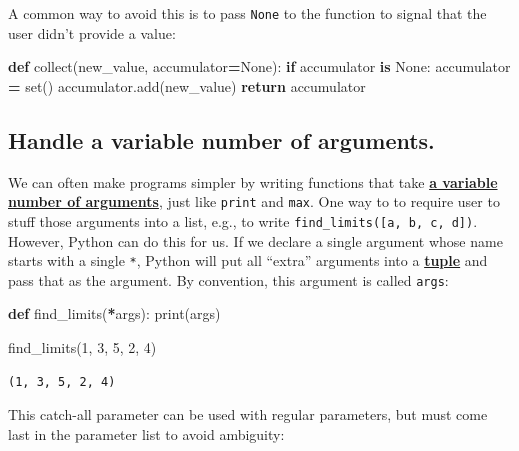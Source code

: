 \documentclass[
]{krantz}
\makeatletter
\newenvironment{Shaded}{\begin{snugshade}}{\end{snugshade}}
\newcommand{\BuiltInTok}[1]{#1}
\newcommand{\ControlFlowTok}[1]{\textcolor[rgb]{0.13,0.29,0.53}{\textbf{#1}}}
\newcommand{\DecValTok}[1]{\textcolor[rgb]{0.00,0.00,0.81}{#1}}
\newcommand{\KeywordTok}[1]{\textcolor[rgb]{0.13,0.29,0.53}{\textbf{#1}}}
\newcommand{\NormalTok}[1]{#1}
\newcommand{\OperatorTok}[1]{\textcolor[rgb]{0.81,0.36,0.00}{\textbf{#1}}}
\newcommand{\VariableTok}[1]{\textcolor[rgb]{0.00,0.00,0.00}{#1}}
\newenvironment{kframe}{%
\medskip{}
\setlength{\fboxsep}{.8em}
 \def\at@end@of@kframe{}%
 \ifinner\ifhmode%
  \def\at@end@of@kframe{\end{minipage}}%
  \begin{minipage}{\columnwidth}%
 \fi\fi%
 \def\FrameCommand##1{\hskip\@totalleftmargin \hskip-\fboxsep
 \colorbox{shadecolor}{##1}\hskip-\fboxsep
     \hskip-\linewidth \hskip-\@totalleftmargin \hskip\columnwidth}%
 \MakeFramed {\advance\hsize-\width
   \@totalleftmargin\z@ \linewidth\hsize
   \@setminipage}}%
 {\par\unskip\endMakeFramed%
 \at@end@of@kframe}
\renewenvironment{Shaded}{\begin{kframe}}{\end{kframe}}
\newcommand{\gref}[2]{\hyperlink{#2}{\textbf{#1}}}
\makeatother
\begin{document}
A common way to avoid this is to pass \texttt{None} to the function
to signal that the user didn't provide a value:

\begin{Shaded}
\begin{Highlighting}[]
\KeywordTok{def}\NormalTok{ collect(new\_value, accumulator}\OperatorTok{=}\VariableTok{None}\NormalTok{):}
    \ControlFlowTok{if}\NormalTok{ accumulator }\KeywordTok{is} \VariableTok{None}\NormalTok{:}
\NormalTok{        accumulator }\OperatorTok{=} \BuiltInTok{set}\NormalTok{()}
\NormalTok{    accumulator.add(new\_value)}
    \ControlFlowTok{return}\NormalTok{ accumulator}
\end{Highlighting}
\end{Shaded}

\hypertarget{handle-a-variable-number-of-arguments.}{%
\subsection{Handle a variable number of arguments.}\label{handle-a-variable-number-of-arguments.}}

We can often make programs simpler by writing functions that take
\gref{a variable number of arguments}{variable\_arguments},
just like \texttt{print} and \texttt{max}.
One way to to require user to stuff those arguments into a list,
e.g.,
to write \texttt{find\_limits({[}a,\ b,\ c,\ d{]})}.
However,
Python can do this for us.
If we declare a single argument whose name starts with a single \texttt{*},
Python will put all ``extra'' arguments into a \gref{tuple}{tuple}
and pass that as the argument.
By convention,
this argument is called \texttt{args}:

\begin{Shaded}
\begin{Highlighting}[]
\KeywordTok{def}\NormalTok{ find\_limits(}\OperatorTok{*}\NormalTok{args):}
    \BuiltInTok{print}\NormalTok{(args)}

\NormalTok{find\_limits(}\DecValTok{1}\NormalTok{, }\DecValTok{3}\NormalTok{, }\DecValTok{5}\NormalTok{, }\DecValTok{2}\NormalTok{, }\DecValTok{4}\NormalTok{)}
\end{Highlighting}
\end{Shaded}

\begin{verbatim}
(1, 3, 5, 2, 4)
\end{verbatim}

This catch-all parameter can be used with regular parameters,
but must come last in the parameter list to avoid ambiguity:
\end{document}
